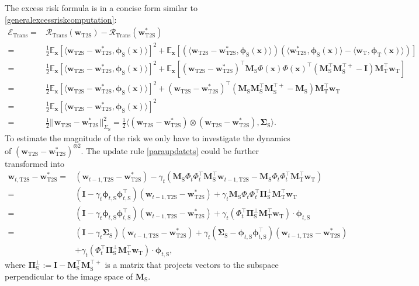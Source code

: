 \documentclass{article}
\theoremstyle{definition}
\theoremstyle{definition}
\theoremstyle{plain}
\theoremstyle{plain}
\theoremstyle{plain}
\theoremstyle{plain}
\theoremstyle{plain}
\newcommand{\bs}[1]{\boldsymbol{\mathbf{#1}}}
\newcommand{\Ex}{\mathbb{E}}
\newcommand{\vecx}{\mathbf{x}}
\newcommand{\te}{\mathrm{T}}
\newcommand{\st}{\mathrm{S}}
\newcommand{\ts}{\mathrm{T2S}}
\newcommand{\M}{\mathbf{M}}
\newcommand{\w}{\mathbf{w}}
\newcommand{\id}{\mathbf{I}}
\begin{document}
The excess risk formula is in a concise form similar to \ref{generalexcessriskcomputation}:
\begin{equation}\label{excessrisktrans}
\begin{aligned}
    \mathcal{E}_{\mathrm{Trans}} =& \mathcal{R}_\mathrm{Trans}(\w_\ts)-\mathcal{R}_\mathrm{Trans}(\w^*_\ts)\\
    =&\frac{1}{2}\Ex_\vecx\left[\langle \w_\ts-\w^*_\ts,\bs\phi_\st(\vecx)\rangle\right]^2+\Ex_\vecx\left[(\langle \w_\ts-\w^*_\ts,\bs\phi_\st(\vecx)\rangle)(\langle \w^*_\ts,\bs\phi_\st(\vecx)\rangle-\langle \w_\te,\bs\phi_\te(\vecx)\rangle)\right]\\
    =& \frac{1}{2}\Ex_\vecx\left[\langle \w_\ts-\w^*_\ts,\bs\phi_\st(\vecx)\rangle\right]^2+\Ex_\vecx\left[ (\w_\ts-\w^*_\ts)^\top\M_\st \Phi(\vecx)\Phi(\vecx)^\top(\M_\st^\top\M_\st^{\top +}-\id)\M_\te^\top \w_\te\right]\\
    =& \frac{1}{2}\Ex_\vecx\left[\langle \w_\ts-\w^*_\ts,\bs\phi_\st(\vecx)\rangle\right]^2+(\w_\ts-\w^*_\ts)^\top(\M_\st \M_\st^\top\M_\st^{\top +}-\M_\st)\M_\te^\top \w_\te\\
    =& \frac{1}{2}\Ex_\vecx\left[\langle \w_\ts-\w^*_\ts,\bs\phi_\st(\vecx)\rangle\right]^2\\
    =& \frac{1}{2}||\w_\ts-\w^*_\ts||_{\Sigma_\st}^2 = \frac{1}{2}\langle (\w_\ts-\w^*_\ts)\otimes(\w_\ts-\w^*_\ts),\mathbf{\Sigma}_\st\rangle.
\end{aligned}
\end{equation}
To estimate the magnitude of the risk we only have to investigate the dynamics of $(\w_\ts-\w^*_\ts)^{\otimes2}$. The update rule \ref{paraupdatets} could be further transformed into 
\begin{equation}
\begin{aligned}
    \w_{t,\ts}-\w^*_\ts=& (\w_{t-1,\ts}-\w^*_\ts)-\gamma_t\left(\M_\st\Phi_t\Phi_t^\top\M_\st^\top \w_{t-1,\ts}- \M_\st\Phi_t\Phi_t^\top\M_\te^\top \w_\te\right)\\
    =& (\id-\gamma_t\mathbf{\bs\phi}_{t,\st}\mathbf{\bs\phi}_{t,\st}^\top)(\w_{t-1,\ts}-\w^*_\ts)+\gamma_t\M_\st\Phi_t\Phi^\top_t\mathbf{\Pi}^\perp_\st\M_\te^\top \w_\te\\
    =& (\id-\gamma_t\mathbf{\bs\phi}_{t,\st}\mathbf{\bs\phi}_{t,\st}^\top)(\w_{t-1,\ts}-\w^*_\ts)+\gamma_t(\Phi^\top_t\mathbf{\Pi}^\perp_\st\M_\te^\top \w_\te)\cdot\bs\phi_{t,\st}\\
    =&  (\id-\gamma_t\mathbf{\Sigma}_\st)(\w_{t-1,\ts}-\w^*_\ts)+\gamma_t(\mathbf{\Sigma}_\st-\mathbf{\bs\phi}_{t,\st}\mathbf{\bs\phi}_{t,\st}^\top)(\w_{t-1,\ts}-\w^*_\ts)\\
    &+\gamma_t(\Phi^\top_t\mathbf{\Pi}^\perp_\st\M_\te^\top \w_\te)\cdot\bs\phi_{t,\st},
\end{aligned}
\end{equation}
where $\mathbf{\Pi}^\perp_\st := \id - \M_\st^\top\M_\st^{\top+}$ is a matrix that projects vectors to the subspace perpendicular to the image space of $\M_\st$.
\end{document}
